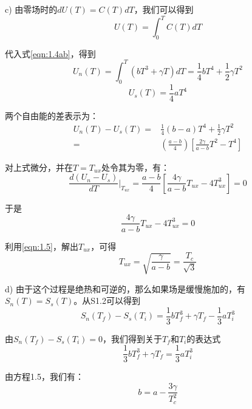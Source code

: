 c) 由零场时的$dU(T)=C(T)dT$，我们可以得到
\begin{equation*}
U(T) =\int_{0}^{T}C(T) dT  \tag{S1.12}
\end{equation*}

代入式\ref{eqn:1.4ab}，得到
\begin{equation*}
U_n(T) =\int_{0}^{T}(bT^3 +\gamma T)dT = \frac{1}{4}bT^4 +\frac{1}{2}\gamma T^2 \tag{S1.13a}
\end{equation*}
\begin{equation*}
U_s(T)=\frac{1}{4}aT^4 \tag{S1.13b}
\end{equation*}

两个自由能的差表示为：
\begin{equation*}
\begin{split}
U_n(T) − U_s(T) =&\frac{1}{4} (b − a)T^4 + \frac{1}{2}\gamma T^2\\
=&\left(\frac{a-b}{4}\right)\left[\frac{2\gamma}{a-b}T^2-T^4\right]
\end{split} \tag{S1.14}
\end{equation*}

对上式微分，并在$T=T_{ux}$处令其为零，有：
\begin{equation*}
\frac{d(U_n-U_s)}{dT}|_{T_{ux}}=\frac{a-b}{4} \left[\frac{4\gamma}{a-b}T_{ux}-4T_{ux}^3\right]=0 \tag{S1.15}
\end{equation*}

于是
\begin{equation*}
\frac{4\gamma}{a-b}T_{ux}-4T_{ux}^3=0 \tag{S1.16}
\end{equation*}

利用\ref{eqn:1.5}，解出$T_{ux}$，可得
\begin{equation*}
T_{ux}=\sqrt{\frac{\gamma}{a-b}}=\frac{T_c}{\sqrt{3}} \tag{1.9}
\end{equation*}

d) 由于这个过程是绝热和可逆的，那么如果场是缓慢施加的，有$S_n(T)=S_s(T)$。从S1.2可以得到
\begin{equation*}
S_n(T_f ) − S_s(T_i) =\frac{1}{3}bT_f^3 +\gamma T_f −\frac{1}{3}aT_i^3 \tag{S1.17}
\end{equation*}

由$S_n(T_f )−S_s(T_i)=0$，我们得到关于$T_f$和$T_i$的表达式
\begin{equation*}
\frac{1}{3}bT_f^3 +\gamma T_f =\frac{1}{3}aT_i^3 \tag{S1.18}
\end{equation*}

由方程1.5，我们有：
\begin{equation*}
b = a − \frac{3\gamma}{T_c^2} \tag{S1.19}
\end{equation*}

